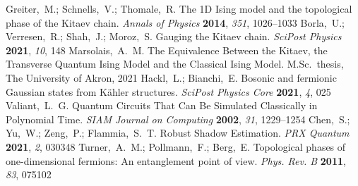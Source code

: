 \documentclass[journal=jctcce,a4paper,manuscript=article]{achemso}
\begin{document}
\begin{mcitethebibliography}{41}
  Greiter,~M.; Schnells,~V.; Thomale,~R. The 1D Ising model and the topological phase of the Kitaev chain. \emph{Annals of Physics} \textbf{2014}, \emph{351}, 1026--1033\relax
  \mciteBstWouldAddEndPuncttrue
  \mciteSetBstMidEndSepPunct{\mcitedefaultmidpunct}
  {\mcitedefaultendpunct}{\mcitedefaultseppunct}\relax
  \EndOfBibitem
  Borla,~U.; Verresen,~R.; Shah,~J.; Moroz,~S. Gauging the Kitaev chain. \emph{SciPost Physics} \textbf{2021}, \emph{10}, 148\relax
  \mciteBstWouldAddEndPuncttrue
  \mciteSetBstMidEndSepPunct{\mcitedefaultmidpunct}
  {\mcitedefaultendpunct}{\mcitedefaultseppunct}\relax
  \EndOfBibitem
  Marsolais,~A.~M. The Equivalence Between the Kitaev, the Transverse Quantum Ising Model and the Classical Ising Model. M.Sc.\ thesis, The University of Akron, 2021\relax
  \mciteBstWouldAddEndPuncttrue
  \mciteSetBstMidEndSepPunct{\mcitedefaultmidpunct}
  {\mcitedefaultendpunct}{\mcitedefaultseppunct}\relax
  \EndOfBibitem
  Hackl,~L.; Bianchi,~E. Bosonic and fermionic Gaussian states from K{\"a}hler structures. \emph{SciPost Physics Core} \textbf{2021}, \emph{4}, 025\relax
  \mciteBstWouldAddEndPuncttrue
  \mciteSetBstMidEndSepPunct{\mcitedefaultmidpunct}
  {\mcitedefaultendpunct}{\mcitedefaultseppunct}\relax
  \EndOfBibitem
  Valiant,~L.~G. Quantum Circuits That Can Be Simulated Classically in Polynomial Time. \emph{SIAM Journal on Computing} \textbf{2002}, \emph{31}, 1229--1254\relax
  \mciteBstWouldAddEndPuncttrue
  \mciteSetBstMidEndSepPunct{\mcitedefaultmidpunct}
  {\mcitedefaultendpunct}{\mcitedefaultseppunct}\relax
  \EndOfBibitem
  Chen,~S.; Yu,~W.; Zeng,~P.; Flammia,~S.~T. Robust Shadow Estimation. \emph{PRX Quantum} \textbf{2021}, \emph{2}, 030348\relax
  \mciteBstWouldAddEndPuncttrue
  \mciteSetBstMidEndSepPunct{\mcitedefaultmidpunct}
  {\mcitedefaultendpunct}{\mcitedefaultseppunct}\relax
  \EndOfBibitem
  Turner,~A.~M.; Pollmann,~F.; Berg,~E. Topological phases of one-dimensional fermions: An entanglement point of view. \emph{Phys. Rev. B} \textbf{2011}, \emph{83}, 075102\relax
  \mciteBstWouldAddEndPuncttrue
  \mciteSetBstMidEndSepPunct{\mcitedefaultmidpunct}
  {\mcitedefaultendpunct}{\mcitedefaultseppunct}\relax

\end{mcitethebibliography}
\end{document}

